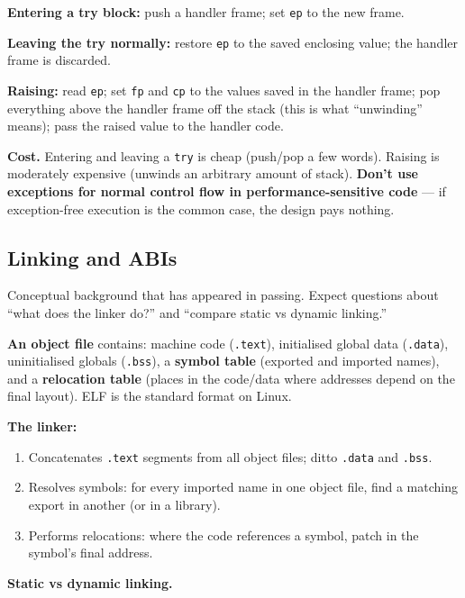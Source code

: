 \documentclass[11pt,a4paper]{article}
\begin{document}
\textbf{Entering a try block:} push a handler frame; set \texttt{ep} to the new frame.

\textbf{Leaving the try normally:} restore \texttt{ep} to the saved enclosing value; the handler frame is discarded.

\textbf{Raising:} read \texttt{ep}; set \texttt{fp} and \texttt{cp} to the values saved in the handler frame; pop everything above the handler frame off the stack (this is what ``unwinding'' means); pass the raised value to the handler code.

\textbf{Cost.} Entering and leaving a \texttt{try} is cheap (push/pop a few words). Raising is moderately expensive (unwinds an arbitrary amount of stack). \textbf{Don't use exceptions for normal control flow in performance-sensitive code} --- if exception-free execution is the common case, the design pays nothing.

\subsection{Linking and ABIs}

\begin{useful}
Conceptual background that has appeared in passing. Expect questions about ``what does the linker do?'' and ``compare static vs dynamic linking.''
\end{useful}

\textbf{An object file} contains: machine code (\texttt{.text}), initialised global data (\texttt{.data}), uninitialised globals (\texttt{.bss}), a \textbf{symbol table} (exported and imported names), and a \textbf{relocation table} (places in the code/data where addresses depend on the final layout). ELF is the standard format on Linux.

\textbf{The linker:}
\begin{enumerate}[leftmargin=*,itemsep=0pt]
  \item Concatenates \texttt{.text} segments from all object files; ditto \texttt{.data} and \texttt{.bss}.
  \item Resolves symbols: for every imported name in one object file, find a matching export in another (or in a library).
  \item Performs relocations: where the code references a symbol, patch in the symbol's final address.
\end{enumerate}

\textbf{Static vs dynamic linking.}
\end{document}
